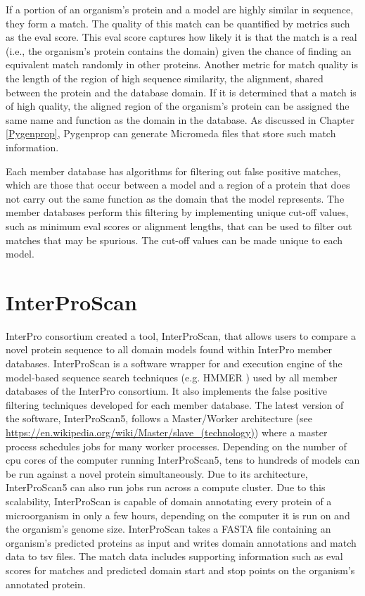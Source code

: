 If a portion of an organism's protein and a model are highly similar in sequence, they form a match. The quality of this match can be quantified by metrics such as the \gls{eval} score. This \gls{eval} score captures how likely it is that the match is a real (i.e., the organism's protein contains the domain) given the chance of finding an equivalent match randomly in other proteins. Another metric for match quality is the length of the region of high sequence similarity, the alignment, shared between the protein and the database domain. If it is determined that a match is of high quality, the aligned region of the organism's protein can be assigned the same name and function as the domain in the database.  As discussed in Chapter \ref{Pygenprop}, Pygenprop can generate Micromeda files that store such match information.

Each member database has algorithms for filtering out false positive matches, which are those that occur between a model and a region of a protein that does not carry out the same function as the domain that the model represents. The member databases perform this filtering by implementing unique cut-off values, such as minimum \gls{eval} scores or alignment lengths, that can be used to filter out matches that may be spurious. The cut-off values can be made unique to each model. 

\section{InterProScan} \label{overview-interproscan}

InterPro consortium created a tool, InterProScan, that allows users to compare a novel protein sequence to all domain models found within InterPro member databases. InterProScan is a software wrapper for and execution engine of the model-based sequence search techniques (e.g. HMMER \cite{eddy2011accelerated}) used by all member databases of the InterPro consortium. It also implements the false positive filtering techniques developed for each member database. The latest version of the software, InterProScan5, follows a Master/Worker architecture (see \href{https://en.wikipedia.org/wiki/Master/slave\_(technology)}{https://en.wikipedia.org/wiki/Master/slave\_(technology)}) where a master process schedules jobs for many worker processes. Depending on the number of \gls{cpu} cores of the computer running InterProScan5, tens to hundreds of models can be run against a novel protein simultaneously. Due to its architecture, InterProScan5 can also run jobs run across a compute cluster. Due to this scalability, InterProScan is capable of domain annotating every protein of a microorganism in only a few hours, depending on the computer it is run on and the organism's genome size. InterProScan takes a FASTA file \cite{pearson19905} containing an organism's predicted proteins as input and writes domain annotations and match data to \gls{tsv} files. The match data includes supporting information such as \gls{eval} scores for matches and predicted domain start and stop points on the organism's annotated protein.

